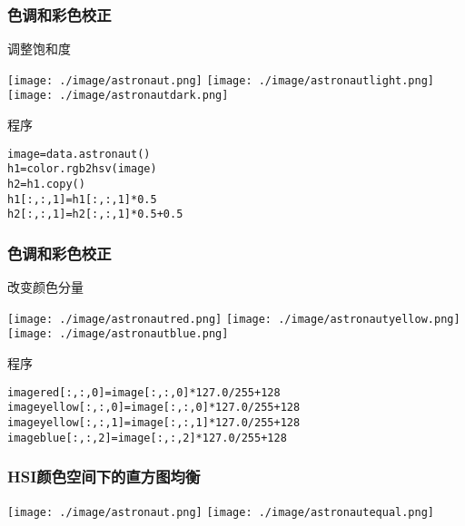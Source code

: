 \documentclass{beamer}
\begin{document}
\begin{frame}[fragile]
\frametitle{色调和彩色校正}
\label{sec-5-5}
\begin{block}{调整饱和度}
\label{sec-5-5-1}

\texttt{[image: ./image/astronaut.png]}
\texttt{[image: ./image/astronautlight.png]}
\texttt{[image: ./image/astronautdark.png]}
\end{block}
\begin{block}{程序}
\label{sec-5-5-2}


\begin{verbatim}
image=data.astronaut()
h1=color.rgb2hsv(image)
h2=h1.copy()
h1[:,:,1]=h1[:,:,1]*0.5
h2[:,:,1]=h2[:,:,1]*0.5+0.5
\end{verbatim}
\end{block}
\end{frame}
\begin{frame}[fragile]
\frametitle{色调和彩色校正}
\label{sec-5-6}
\begin{block}{改变颜色分量}
\label{sec-5-6-1}

\texttt{[image: ./image/astronautred.png]}
\texttt{[image: ./image/astronautyellow.png]}
\texttt{[image: ./image/astronautblue.png]}
\end{block}
\begin{block}{程序}
\label{sec-5-6-2}


\begin{verbatim}
imagered[:,:,0]=image[:,:,0]*127.0/255+128
imageyellow[:,:,0]=image[:,:,0]*127.0/255+128
imageyellow[:,:,1]=image[:,:,1]*127.0/255+128
imageblue[:,:,2]=image[:,:,2]*127.0/255+128
\end{verbatim}
\end{block}
\end{frame}
\begin{frame}
\frametitle{HSI颜色空间下的直方图均衡}
\label{sec-5-7}

\texttt{[image: ./image/astronaut.png]}
\texttt{[image: ./image/astronautequal.png]}
\end{frame}
\end{document}
